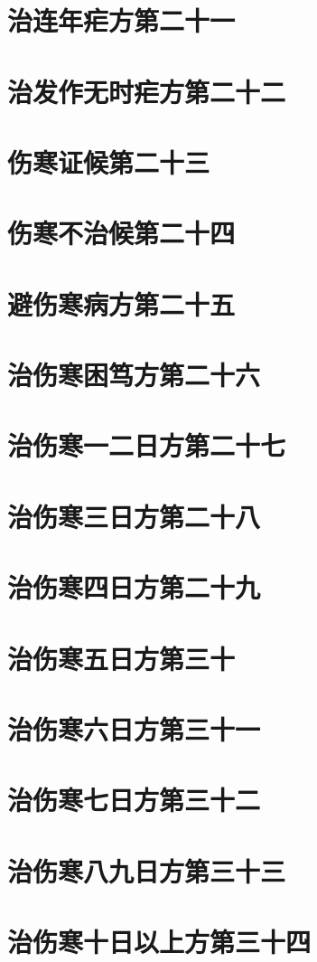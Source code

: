 \documentclass[a4paper,12pt,UTF8,twoside]{ctexbook}
\begin{document}
\chapter{治连年疟方第二十一}
\chapter{治发作无时疟方第二十二}
\chapter{伤寒证候第二十三}
\chapter{伤寒不治候第二十四}
\chapter{避伤寒病方第二十五}
\chapter{治伤寒困笃方第二十六}
\chapter{治伤寒一二日方第二十七}
\chapter{治伤寒三日方第二十八}
\chapter{治伤寒四日方第二十九}
\chapter{治伤寒五日方第三十}
\chapter{治伤寒六日方第三十一}
\chapter{治伤寒七日方第三十二}
\chapter{治伤寒八九日方第三十三}
\chapter{治伤寒十日以上方第三十四}
\end{document}
